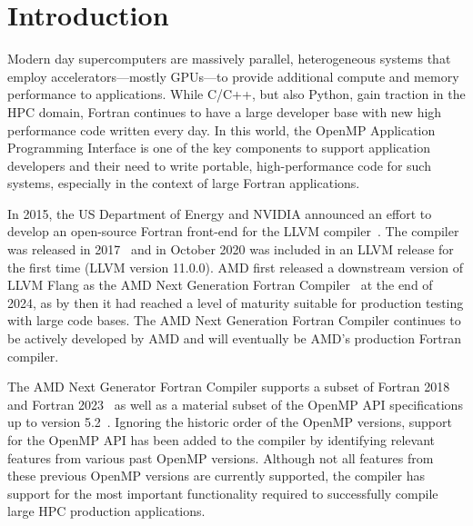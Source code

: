\documentclass[acmtog,natbib=false]{acmart}
\begin{document}

\acresetall
\section{Introduction}
\label{sec:Introduction}

Modern day supercomputers are massively parallel, heterogeneous systems that employ accelerators---mostly \acp{GPU}---to provide additional compute and memory performance to applications.
While C/C++, but also Python, gain traction in the \ac{HPC} domain, Fortran continues to have a large developer base with new high performance code written every day.
In this world, the OpenMP Application Programming Interface is one of the key components to support application developers and their need to write portable, high-performance code for such systems, especially in the context of large Fortran applications.

In 2015, the US Department of Energy and NVIDIA announced an effort to develop an open-source Fortran front-end for the LLVM compiler~\cite{Flang-Nvidia-NNSA}.
The compiler was released in 2017~\cite{Pric17} and in October 2020 was included in an LLVM release for the first time (LLVM version 11.0.0).
AMD first released a downstream version of LLVM Flang as the AMD Next Generation Fortran Compiler~\cite{AMD24} at the end of 2024, as by then it had reached a level of maturity suitable for production testing with large code bases.
The AMD Next Generation Fortran Compiler continues to be actively developed by AMD and will eventually be AMD's production Fortran compiler.

The AMD Next Generator Fortran Compiler supports a subset of Fortran 2018~\cite{F2018} and Fortran 2023~\cite{F2023} as well as a material subset of the OpenMP \ac{API} specifications up to version 5.2~\cite{OARB21}.
Ignoring the historic order of the OpenMP versions, support for the OpenMP \ac{API} has been added to the compiler by identifying relevant features from various past OpenMP versions.
Although not all features from these previous OpenMP versions are currently supported, the compiler has support for the most important functionality required to successfully compile large \ac{HPC} production applications.
\end{document}
